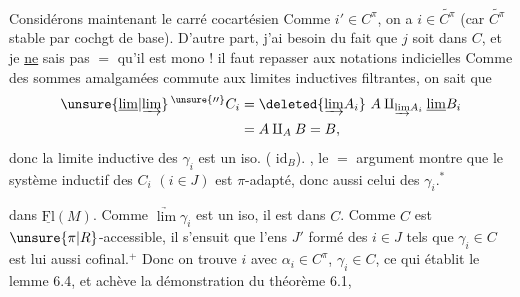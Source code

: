 Considérons maintenant le carré cocartésien
Comme $i'\in C^\pi$, on a $i\in\widetilde{C^\pi}$ (car $\widetilde{C^\pi}$ stable par cochgt de base). D'autre part, j'ai besoin du fait que $j$ soit dans $C$,  et je \uline{ne} sais pas $=$ qu'il est mono !  il faut repasser aux notations indicielles
Comme  des sommes amalgamées commute aux limites inductives filtrantes, on sait que
\[
 \begin{aligned}
 \unsure{\underline{\lim}|\underrightarrow{\lim}}\,^{\unsure{\prime\prime}} C_i
 &=\deleted{\underrightarrow{\lim}A_i}\ A\amalg_{\underrightarrow{\lim} A_i}\underline{\lim}B_i\\
 &=A\amalg_A B=B,
 \end{aligned}
\]
donc la limite inductive des $\gamma_i$ est un iso. ( $\mathrm{id}_B$). , le $=$ argument montre que le système inductif des $C_i$ $(i\in J)$  est  $\pi$-adapté, donc aussi celui des $\gamma_i$.$^{\ast}$

dans $\underline{\mathrm{Fl}}(M)$. Comme $\underrightarrow{\lim}\gamma_i$   est un iso, il est dans $C$.  Comme $C$ est $\unsure{\pi|R}$-accessible, il s'ensuit que l'ens $J'$ formé des  $i\in J$ tels que $\gamma_i\in C$ est lui aussi cofinal.$^{+}$
 Donc on trouve $i$ avec $\alpha_i\in C^\pi$, $\gamma_i\in C$, ce qui établit le lemme 6.4, et achève la démonstration du théorème 6.1,

